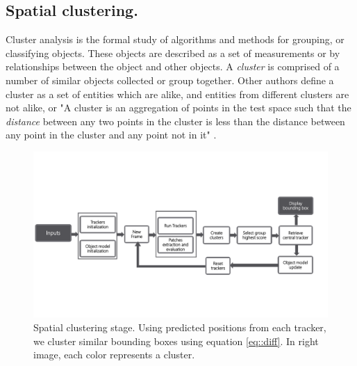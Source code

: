 
\subsection{Spatial clustering.}

Cluster analysis is the formal study of algorithms and methods for grouping, or
classifying objects. These objects are described as a set of measurements or by
relationships between the object and other objects. A \textit{cluster} is
comprised of a number of similar objects collected or group together. Other
authors define a cluster as a set of entities which are alike, and entities from
different clusters are not alike, or "A cluster is an aggregation of points in
the test space such that the \textit{distance} between any two points in the
cluster is less than the distance between any point in the cluster and any point
not in it" \cite{Jain88}.

\begin{figure}[b!]
\centering
\includegraphics[page=4, width=0.9\linewidth, trim= 0.4cm 5.5cm 6.5cm 5cm,
                 clip=true]{Figures/global_diagram}
\caption[Spatial clustering stage]{\small Spatial clustering stage. Using
        predicted positions from each tracker, we cluster similar bounding boxes using
        equation \ref{eq::diff}. In right image, each color represents a cluster.}
\label{fig::clustering}
\end{figure}

